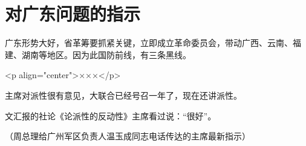 \section[对广东问题的指示（一九六八年二月）]{对广东问题的指示}


广东形势大好，省革筹要抓紧关键，立即成立革命委员会，带动广西、云南、福建、湖南等地区。因为此国防前线，有三条黑线。

<p align="center">×××</p>

主席对派性很有意见，大联合已经号召一年了，现在还讲派性。

文汇报的社论《论派性的反动性》主席看过说：“很好”。

{\raggedleft （周总理给广州军区负责人温玉成同志电话传达的主席最新指示）\par}


